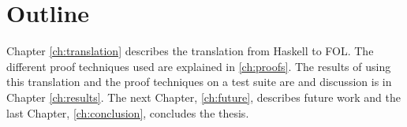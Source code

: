 
\section{Outline}

Chapter \ref{ch:translation} describes the translation from Haskell to
FOL. The different proof techniques used are explained in
\ref{ch:proofs}. The results of using this translation and the proof
techniques on a test suite are and discussion is in Chapter
\ref{ch:results}. The next Chapter, \ref{ch:future}, describes future
work and the last Chapter, \ref{ch:conclusion}, concludes the thesis.
